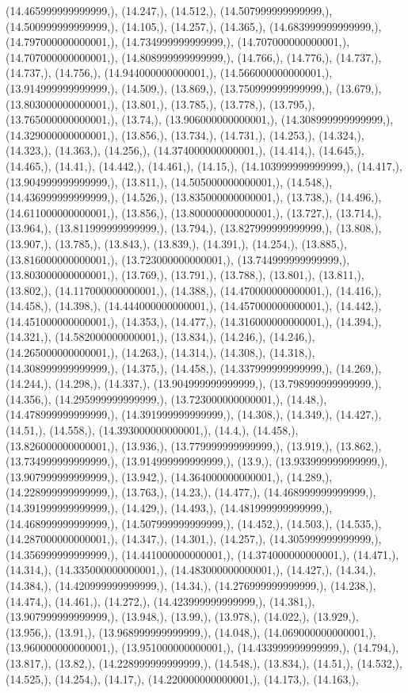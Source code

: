 \documentclass{article}
\begin{document}
(14.465999999999999,), (14.247,), (14.512,), (14.507999999999999,), (14.500999999999999,), (14.105,), (14.257,), (14.365,), (14.683999999999999,), (14.797000000000001,), (14.734999999999999,), (14.707000000000001,), (14.707000000000001,), (14.808999999999999,), (14.766,), (14.776,), (14.737,), (14.737,), (14.756,), (14.944000000000001,), (14.566000000000001,), (13.914999999999999,), (14.509,), (13.869,), (13.750999999999999,), (13.679,), (13.803000000000001,), (13.801,), (13.785,), (13.778,), (13.795,), (13.765000000000001,), (13.74,), (13.906000000000001,), (14.308999999999999,), (14.329000000000001,), (13.856,), (13.734,), (14.731,), (14.253,), (14.324,), (14.323,), (14.363,), (14.256,), (14.374000000000001,), (14.414,), (14.645,), (14.465,), (14.41,), (14.442,), (14.461,), (14.15,), (14.103999999999999,), (14.417,), (13.904999999999999,), (13.811,), (14.505000000000001,), (14.548,), (14.436999999999999,), (14.526,), (13.835000000000001,), (13.738,), (14.496,), (14.611000000000001,), (13.856,), (13.800000000000001,), (13.727,), (13.714,), (13.964,), (13.811999999999999,), (13.794,), (13.827999999999999,), (13.808,), (13.907,), (13.785,), (13.843,), (13.839,), (14.391,), (14.254,), (13.885,), (13.816000000000001,), (13.723000000000001,), (13.744999999999999,), (13.803000000000001,), (13.769,), (13.791,), (13.788,), (13.801,), (13.811,), (13.802,), (14.117000000000001,), (14.388,), (14.470000000000001,), (14.416,), (14.458,), (14.398,), (14.444000000000001,), (14.457000000000001,), (14.442,), (14.451000000000001,), (14.353,), (14.477,), (14.316000000000001,), (14.394,), (14.321,), (14.582000000000001,), (13.834,), (14.246,), (14.246,), (14.265000000000001,), (14.263,), (14.314,), (14.308,), (14.318,), (14.308999999999999,), (14.375,), (14.458,), (14.337999999999999,), (14.269,), (14.244,), (14.298,), (14.337,), (13.904999999999999,), (13.798999999999999,), (14.356,), (14.295999999999999,), (13.723000000000001,), (14.48,), (14.478999999999999,), (14.391999999999999,), (14.308,), (14.349,), (14.427,), (14.51,), (14.558,), (14.393000000000001,), (14.4,), (14.458,), (13.826000000000001,), (13.936,), (13.779999999999999,), (13.919,), (13.862,), (13.734999999999999,), (13.914999999999999,), (13.9,), (13.933999999999999,), (13.907999999999999,), (13.942,), (14.364000000000001,), (14.289,), (14.228999999999999,), (13.763,), (14.23,), (14.477,), (14.468999999999999,), (14.391999999999999,), (14.429,), (14.493,), (14.481999999999999,), (14.468999999999999,), (14.507999999999999,), (14.452,), (14.503,), (14.535,), (14.287000000000001,), (14.347,), (14.301,), (14.257,), (14.305999999999999,), (14.356999999999999,), (14.441000000000001,), (14.374000000000001,), (14.471,), (14.314,), (14.335000000000001,), (14.483000000000001,), (14.427,), (14.34,), (14.384,), (14.420999999999999,), (14.34,), (14.276999999999999,), (14.238,), (14.474,), (14.461,), (14.272,), (14.423999999999999,), (14.381,), (13.907999999999999,), (13.948,), (13.99,), (13.978,), (14.022,), (13.929,), (13.956,), (13.91,), (13.968999999999999,), (14.048,), (14.069000000000001,), (13.960000000000001,), (13.951000000000001,), (14.433999999999999,), (14.794,), (13.817,), (13.82,), (14.228999999999999,), (14.548,), (13.834,), (14.51,), (14.532,), (14.525,), (14.254,), (14.17,), (14.220000000000001,), (14.173,), (14.163,), 
\end{document}
